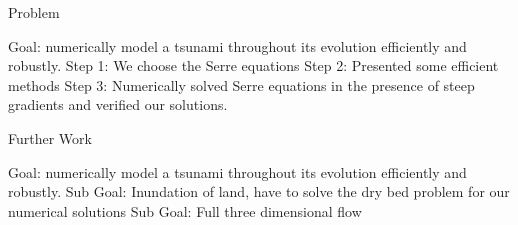 \documentclass[pdf]{beamer}
\begin{document}
\begin{frame}{Problem}
	
	Goal: numerically model a tsunami throughout its evolution efficiently and robustly.
	\vskip 0.2cm
	Step 1: We choose the Serre equations 
	\vskip 0.2cm
	Step 2: Presented some efficient methods
	\vskip 0.2cm
	Step 3: Numerically solved Serre equations in the presence of steep gradients and verified our solutions.
		
\end{frame}

\begin{frame}{Further Work}
	
	Goal: numerically model a tsunami throughout its evolution efficiently and robustly.
	\vskip 0.2cm
	Sub Goal: Inundation of land, have to solve the dry bed problem for our numerical solutions
	\vskip 0.2cm
	Sub Goal: Full three dimensional flow
	
\end{frame}
\end{document}
